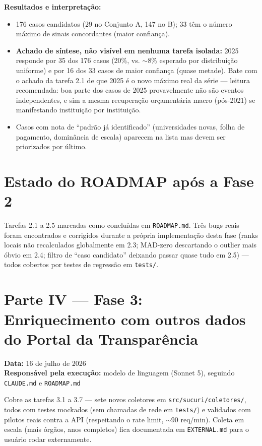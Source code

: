 \documentclass[11pt,a4paper]{article}
\begin{document}
\textbf{Resultados e interpretação:}

\begin{itemize}
    \item 176 casos candidatos (29 no Conjunto A, 147 no B); 33 têm o
    número máximo de sinais concordantes (maior confiança).
    \item \textbf{Achado de síntese, não visível em nenhuma tarefa
    isolada:} 2025 responde por 35 dos 176 casos (20\%, vs.
    ${\sim}$8\% esperado por distribuição uniforme) e por 16 dos 33 casos
    de maior confiança (quase metade). Bate com o achado da tarefa 2.1 de
    que 2025 é o novo máximo real da série --- leitura recomendada: boa
    parte dos casos de 2025 provavelmente não são eventos independentes,
    e sim a mesma recuperação orçamentária macro (pós-2021) se
    manifestando instituição por instituição.
    \item Casos com nota de ``padrão já identificado'' (universidades
    novas, folha de pagamento, dominância de escala) aparecem na lista mas
    devem ser priorizados por último.
\end{itemize}

\section{Estado do ROADMAP após a Fase 2}

Tarefas 2.1 a 2.5 marcadas como concluídas em \texttt{ROADMAP.md}. Três
bugs reais foram encontrados e corrigidos durante a própria implementação
desta fase (ranks locais não recalculados globalmente em 2.3; MAD-zero
descartando o outlier mais óbvio em 2.4; filtro de ``caso candidato''
deixando passar quase tudo em 2.5) --- todos cobertos por testes de
regressão em \texttt{tests/}.

\clearpage
\section*{Parte IV --- Fase 3: Enriquecimento com outros dados do Portal da Transparência}

\noindent\textbf{Data:} 16 de julho de 2026 \\
\textbf{Responsável pela execução:} modelo de linguagem (Sonnet 5), seguindo \texttt{CLAUDE.md} e \texttt{ROADMAP.md}

\bigskip
\noindent Cobre as tarefas 3.1 a 3.7 --- sete novos coletores em
\texttt{src/sucuri/coletores/}, todos com testes mockados (sem chamadas de
rede em \texttt{tests/}) e validados com pilotos reais contra a API
(respeitando o rate limit, ${\sim}$90 req/min). Coleta em escala (mais
órgãos, anos completos) fica documentada em \texttt{EXTERNAL.md} para o
usuário rodar externamente.
\end{document}
